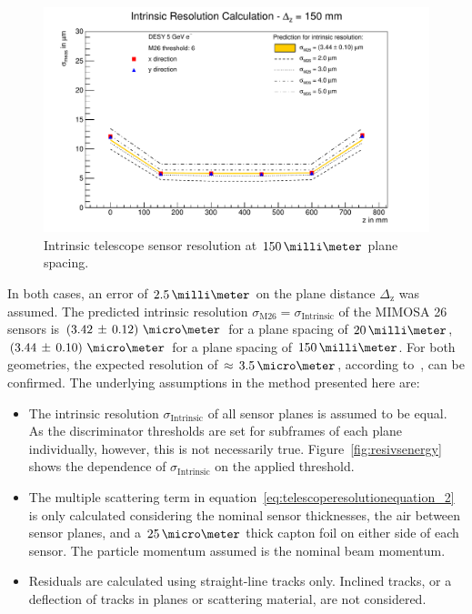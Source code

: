 \begin{figure}[hbtp]
\centering
\includegraphics[width=\textwidth]{figures/wide_smiley.pdf}
\caption[Intrinsic telescope sensor resolution at $150\,\milli\meter$ plane
spacing]{Intrinsic telescope sensor resolution at $150\,\milli\meter$ plane
spacing.}
\label{fig:smileythick}
\end{figure}

In both cases, an error of $2.5\,\milli\meter$ on the plane distance
$\Delta_{\textrm{z}}$ was assumed. The predicted intrinsic resolution
$\sigma_{\textrm{M26}} = \sigma_{\textrm{Intrinsic}}$ of the MIMOSA 26 sensors
is \allowbreak$\left( 3.42\,\pm\, \allowbreak 0.12 \right)\,\micro\meter$ for a
plane spacing of
$20\,\milli\meter$, $\left( 3.44\,\pm\,0.10 \right)\,\micro\meter$ for a plane
spacing of $150\,\milli\meter$. For both geometries, the expected resolution of
$\approx\,3.5\,\micro\meter$, according to~\cite{ref:mimosa26}, can be
confirmed. The underlying assumptions in the method presented here are:

\begin{itemize}
\item The intrinsic resolution $\sigma_{\textrm{Intrinsic}}$ of all sensor
planes is assumed to be equal. As the discriminator thresholds are set for
subframes of each plane individually, however, this is not necessarily true.
Figure~\ref{fig:resivsenergy} shows the dependence of
$\sigma_{\textrm{Intrinsic}}$ on the applied threshold.

\item The multiple scattering term in
equation~\ref{eq:telescoperesolutionequation_2} is only calculated considering
the nominal sensor thicknesses, the air between sensor planes, and a
$25\,\micro\meter$ thick capton foil on either side of each sensor. The particle
momentum assumed is the nominal beam momentum.

\item Residuals are calculated using straight-line tracks only. Inclined tracks,
or a deflection of tracks in planes or scattering material, are not
considered.
\end{itemize}

